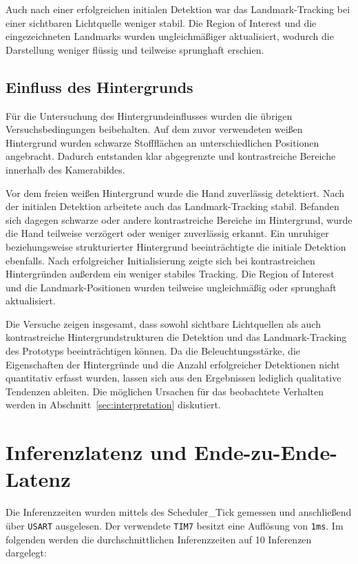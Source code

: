 Auch nach einer erfolgreichen initialen Detektion war das Landmark-Tracking bei einer sichtbaren Lichtquelle weniger stabil. Die Region of Interest und die eingezeichneten Landmarks wurden ungleichmäßiger aktualisiert, wodurch die Darstellung weniger flüssig und teilweise sprunghaft erschien.

\subsection{Einfluss des Hintergrunds}\label{sec:hintergrund}

Für die Untersuchung des Hintergrundeinflusses wurden die übrigen Versuchsbedingungen beibehalten. Auf dem zuvor verwendeten weißen Hintergrund wurden schwarze Stoffflächen an unterschiedlichen Positionen angebracht. Dadurch entstanden klar abgegrenzte und kontrastreiche Bereiche innerhalb des Kamerabildes.

Vor dem freien weißen Hintergrund wurde die Hand zuverlässig detektiert. Nach der initialen Detektion arbeitete auch das Landmark-Tracking stabil. Befanden sich dagegen schwarze oder andere kontrastreiche Bereiche im Hintergrund, wurde die Hand teilweise verzögert oder weniger zuverlässig erkannt. Ein unruhiger beziehungsweise strukturierter Hintergrund beeinträchtigte die initiale Detektion ebenfalls. Nach erfolgreicher Initialisierung zeigte sich bei kontrastreichen Hintergründen außerdem ein weniger stabiles Tracking. Die Region of Interest und die Landmark-Positionen wurden teilweise ungleichmäßig oder sprunghaft aktualisiert.

Die Versuche zeigen insgesamt, dass sowohl sichtbare Lichtquellen als auch kontrastreiche Hintergrundstrukturen die Detektion und das Landmark-Tracking des Prototyps beeinträchtigen können. Da die Beleuchtungsstärke, die Eigenschaften der Hintergründe und die Anzahl erfolgreicher Detektionen nicht quantitativ erfasst wurden, lassen sich aus den Ergebnissen lediglich qualitative Tendenzen ableiten. Die möglichen Ursachen für das beobachtete Verhalten werden in Abschnitt~\ref{sec:interpretation} diskutiert.

\newpage
\section{Inferenzlatenz und Ende-zu-Ende-Latenz}\label{sec:inferenzlatenz}

Die Inferenzzeiten wurden mittels des Scheduler\_Tick gemessen und anschließend über \texttt{USART} ausgelesen. Der verwendete \texttt{TIM7} besitzt eine Auflösung von \texttt{1ms}. Im folgenden werden die durchschnittlichen Inferenzzeiten auf 10 Inferenzen dargelegt:

